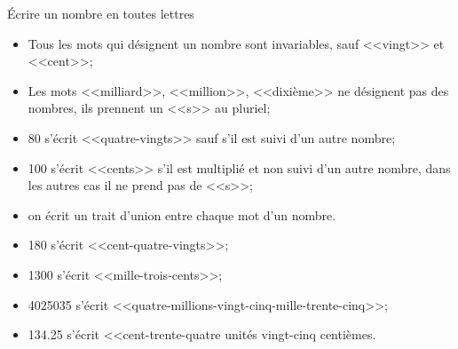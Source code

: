 \begin{mymethname}{\'Ecrire un nombre en toutes lettres}
	\begin{itemize}
		\item Tous les mots qui désignent un nombre sont invariables, sauf <<vingt>> et <<cent>>;
		\item Les mots <<milliard>>, <<million>>, <<dixième>> ne désignent pas des nombres, ils prennent un <<s>> au pluriel;
		\item 80 s'écrit <<quatre-vingts>> sauf s'il est suivi d'un autre nombre;
		\item 100 s'écrit <<cents>> s'il est multiplié et non suivi d'un autre nombre, dans les autres cas il ne prend pas de <<s>>;
		\item on écrit un trait d'union entre chaque mot d'un nombre.
	\end{itemize}
\end{mymethname}

\begin{myexs}
	\begin{itemize}
		\item 180 s'écrit \pause <<cent-quatre-vingts>>;\pause
		\item \num{1300} s'écrit \pause <<mille-trois-cents>>;\pause
		\item \num{4025035} s'écrit \pause <<quatre-millions-vingt-cinq-mille-trente-cinq>>;
		\item \num{134.25} s'écrit \pause <<cent-trente-quatre unités vingt-cinq centièmes.
	\end{itemize}
\end{myexs}

%	
